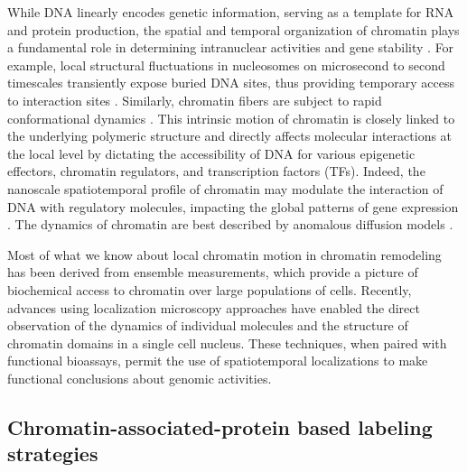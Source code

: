 While DNA linearly encodes genetic information, serving as a template for RNA and protein production, the spatial and temporal organization of chromatin plays a fundamental role in determining intranuclear activities and gene stability \parencite{Cuvier2017,Dion2013}. For example, local structural fluctuations in nucleosomes on microsecond to second timescales transiently expose buried DNA sites, thus providing temporary access to interaction sites \parencite{Choy2012}. Similarly, chromatin fibers are subject to rapid conformational dynamics \parencite{Li2016}. This intrinsic motion of chromatin is closely linked to the underlying polymeric structure and directly affects molecular interactions at the local level by dictating the accessibility of DNA for various epigenetic effectors, chromatin regulators, and transcription factors (TFs). Indeed, the nanoscale spatiotemporal profile of chromatin may modulate the interaction of DNA with regulatory molecules, impacting the global patterns of gene expression \parencite{Bintu2018,Boettiger2016,Grant2018,Xu2018}. The dynamics of chromatin are best described by anomalous diffusion models \parencite{Fierz2019,Shukron2019}.

Most of what we know about local chromatin motion in chromatin remodeling has been derived from ensemble measurements, which provide a picture of biochemical access to chromatin over large populations of cells. Recently, advances using localization microscopy approaches have enabled the direct observation of the dynamics of individual molecules and the structure of chromatin domains in a single cell nucleus. These techniques, when paired with functional bioassays, permit the use of spatiotemporal localizations to make functional conclusions about genomic activities.

\subsection{Chromatin-associated-protein based labeling strategies}

